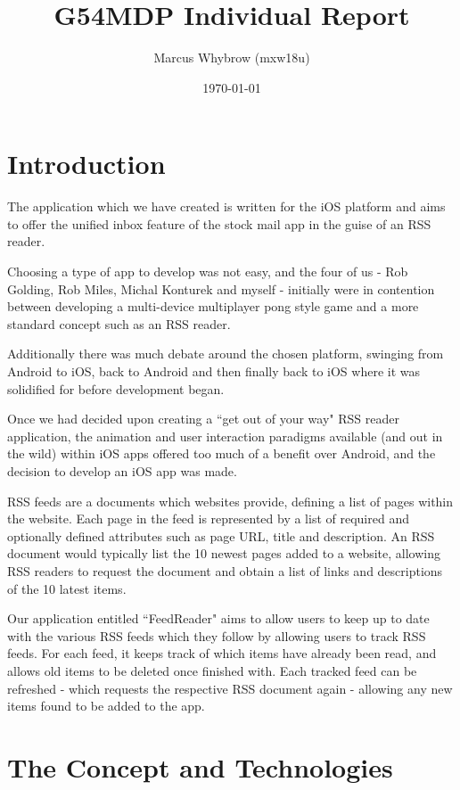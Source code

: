 \documentclass[a4paper,11pt]{article}
\title{G54MDP Individual Report}
\author{Marcus Whybrow (mxw18u)} \date{\today}
\begin{document}
	\maketitle
	
	\section{Introduction}
	
	The application which we have created is written for the iOS platform and
	aims to offer the unified inbox feature of the stock mail app in the guise
	of an RSS reader.
	
	Choosing a type of app to develop was not easy, and the four of us - Rob
	Golding, Rob Miles, Michal Konturek and myself - initially were in
	contention between developing a multi-device multiplayer pong style game
	and a more standard concept such as an RSS reader.
	
	Additionally there was much debate around the chosen platform, swinging
	from Android to iOS, back to Android and then finally back to iOS where it
	was solidified for before development began.
	
	Once we had decided upon creating a ``get out of your way" RSS reader 
	application, the animation and user interaction paradigms available (and 
	out in the wild) within iOS apps offered too much of a benefit over
	Android, and the decision to develop an iOS app was made.
	
	RSS feeds are a documents which websites provide, defining a list of pages
	within the website. Each page in the feed is represented by a list of
	required and optionally defined attributes such as page URL, title and
	description. An RSS document would typically list the 10 newest pages
	added to a website, allowing RSS readers to request the document and
	obtain a list of links and descriptions of the 10 latest items.
	
	Our application entitled ``FeedReader" aims to allow users to keep up to
	date with the various RSS feeds which they follow by allowing users to
	track RSS feeds. For each feed, it keeps track of which items have already
	been read, and allows old items to be deleted once finished with. Each
	tracked feed can be refreshed - which requests the respective RSS document
	again - allowing any new items found to be added to the app.
	
	\section{The Concept and Technologies}
	
\end{document}
